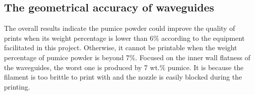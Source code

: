 \subsection{The geometrical accuracy of waveguides}
The overall results indicate the pumice powder could improve the quality of prints when its weight percentage is lower than 6$\%$ according to the equipment facilitated in this project. Otherwise, it cannot be printable when the weight percentage of pumice powder is beyond 7\%. Focused on the inner wall flatness of the waveguides, the worst one is produced by 7 wt.$\%$ pumice. It is because the filament is too brittle to print with and the nozzle is easily blocked during the printing.

\begin{figure}[htbp] %
	\centering
\end{figure}
